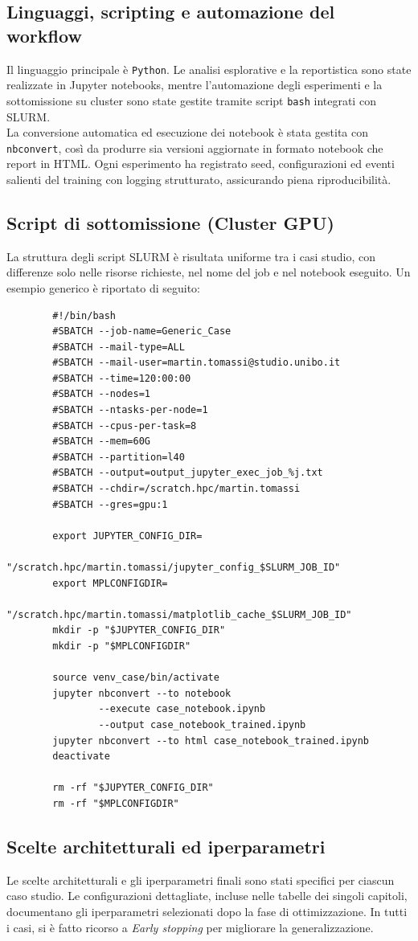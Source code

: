 \documentclass[a4paper,12pt]{report}
\begin{document}
	\subsection{Linguaggi, scripting e automazione del workflow}
	Il linguaggio principale è \texttt{Python}. Le analisi esplorative e la reportistica sono state realizzate in Jupyter notebooks, mentre l’automazione degli esperimenti e la sottomissione su cluster sono state gestite tramite script \texttt{bash} integrati con SLURM. \\
	La conversione automatica ed esecuzione dei notebook è stata gestita con \texttt{nbconvert}, così da produrre sia versioni aggiornate in formato notebook che report in HTML. Ogni esperimento ha registrato seed, configurazioni ed eventi salienti del training con logging strutturato, assicurando piena riproducibilità.
	
	\subsection{Script di sottomissione (Cluster GPU)}
	La struttura degli script SLURM è risultata uniforme tra i casi studio, con differenze solo nelle risorse richieste, nel nome del job e nel notebook eseguito. Un esempio generico è riportato di seguito:
	
	\begin{verbatim}
		#!/bin/bash
		#SBATCH --job-name=Generic_Case
		#SBATCH --mail-type=ALL
		#SBATCH --mail-user=martin.tomassi@studio.unibo.it
		#SBATCH --time=120:00:00
		#SBATCH --nodes=1
		#SBATCH --ntasks-per-node=1
		#SBATCH --cpus-per-task=8
		#SBATCH --mem=60G
		#SBATCH --partition=l40
		#SBATCH --output=output_jupyter_exec_job_%j.txt
		#SBATCH --chdir=/scratch.hpc/martin.tomassi
		#SBATCH --gres=gpu:1
		
		export JUPYTER_CONFIG_DIR=
				"/scratch.hpc/martin.tomassi/jupyter_config_$SLURM_JOB_ID"
		export MPLCONFIGDIR=
				"/scratch.hpc/martin.tomassi/matplotlib_cache_$SLURM_JOB_ID"
		mkdir -p "$JUPYTER_CONFIG_DIR"
		mkdir -p "$MPLCONFIGDIR"
		
		source venv_case/bin/activate
		jupyter nbconvert --to notebook
				--execute case_notebook.ipynb
				--output case_notebook_trained.ipynb
		jupyter nbconvert --to html case_notebook_trained.ipynb
		deactivate
		
		rm -rf "$JUPYTER_CONFIG_DIR"
		rm -rf "$MPLCONFIGDIR"
	\end{verbatim}
	
	\subsection{Scelte architetturali ed iperparametri}
	Le scelte architetturali e gli iperparametri finali sono stati specifici per ciascun caso studio. Le configurazioni dettagliate, incluse nelle tabelle dei singoli capitoli, documentano gli iperparametri selezionati dopo la fase di ottimizzazione. In tutti i casi, si è fatto ricorso a \textit{Early stopping} per migliorare la generalizzazione.
	
\end{document}
